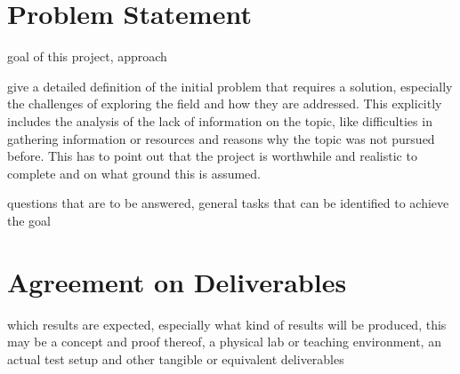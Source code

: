 \chapter{Problem Statement}
\label{chp:problem}


\begin{shaded}
\noindent
goal of this project, approach

\medskip
\noindent
give a detailed definition of the initial problem that requires a solution, especially the challenges of exploring the field and how they are addressed. This explicitly includes the analysis of the lack of information on the topic, like difficulties in gathering information or resources and reasons why the topic was not pursued before. This has to point out that the project is worthwhile and realistic to complete and on what ground this is assumed.

\medskip
\noindent
questions that are to be answered, general tasks that can be identified to achieve the goal
\end{shaded}

\lipsum[21-24]


\chapter{Agreement on Deliverables}
\label{chp:deliverables}


\begin{shaded}
\noindent
which results are expected, especially what kind of results will be produced, this may be a concept and proof thereof, a physical lab or teaching environment, an actual test setup and other tangible or equivalent deliverables
\end{shaded}


\lipsum[25-28]
